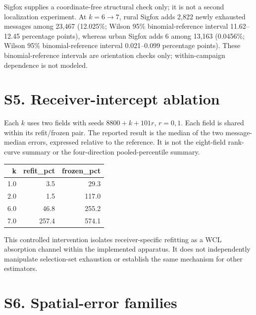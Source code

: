 \documentclass[journal,onecolumn,10pt]{IEEEtran}
\begin{document}
Sigfox supplies a coordinate-free structural check only; it is not a second localization experiment. At $k=6\rightarrow7$, rural Sigfox adds 2,822 newly exhausted messages among 23,467 (12.025\%; Wilson 95\% binomial-reference interval 11.62--12.45 percentage points), whereas urban Sigfox adds 6 among 13,163 (0.0456\%; Wilson 95\% binomial-reference interval 0.021--0.099 percentage points). These binomial-reference intervals are orientation checks only; within-campaign dependence is not modeled.

\Needspace{7cm}
\section*{S5. Receiver-intercept ablation}\label{s5.-receiver-intercept-ablation}

Each $k$ uses two fields with seeds $8800+k+101r$, $r=0,1$. Each field is shared within its refit/frozen pair. The reported result is the median of the two message-median errors, expressed relative to the reference. It is not the eight-field rank-curve summary or the four-direction pooled-percentile summary.


\begin{center}\begin{minipage}{\textwidth}\centering
{}

\begin{tabular}{@{}rrr@{}}
\toprule\noalign{}
k & refit\_pct & frozen\_pct \\
\midrule\noalign{}

1.0 & 3.5 & 29.3 \\
2.0 & 1.5 & 117.0 \\
6.0 & 46.8 & 255.2 \\
7.0 & 257.4 & 574.1 \\
\bottomrule
\end{tabular}
\end{minipage}\end{center}

This controlled intervention isolates receiver-specific refitting as a WCL absorption channel within the implemented apparatus. It does not independently manipulate selection-set exhaustion or establish the same mechanism for other estimators.

\section*{S6. Spatial-error families}\label{s6.-spatial-error-families}
\end{document}
